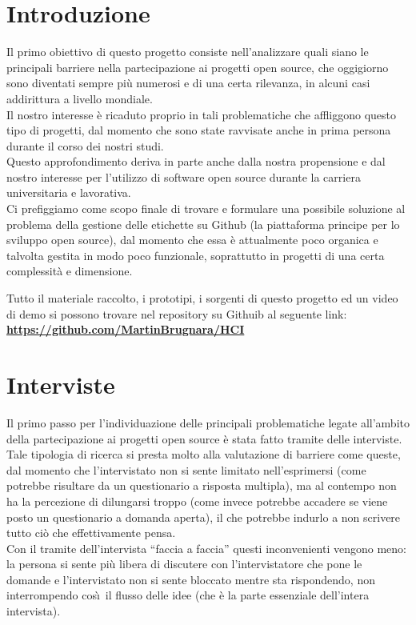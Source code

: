 \documentclass[12pt]{article} %
\begin{document}
\section{Introduzione}
Il primo obiettivo di questo progetto consiste nell'analizzare quali siano le principali barriere nella partecipazione ai progetti open source, che oggigiorno sono diventati sempre pi\`u numerosi e di una certa rilevanza, in alcuni casi addirittura a livello mondiale.\\
Il nostro interesse \`e ricaduto proprio in tali problematiche che affliggono questo tipo di progetti, dal momento che sono state ravvisate anche in prima persona durante il corso dei nostri studi.\\
Questo approfondimento deriva in parte anche dalla nostra propensione e dal nostro interesse per l'utilizzo di software open source durante la carriera universitaria e lavorativa.\\
Ci prefiggiamo come scopo finale di trovare e formulare una possibile soluzione al problema della gestione delle etichette su Github (la piattaforma principe per lo sviluppo open source), dal momento che essa \`e attualmente poco organica e talvolta gestita in modo poco funzionale, soprattutto in progetti di una certa complessit\`a e dimensione.\\
\vfill
\begin{center}
Tutto il materiale raccolto, i prototipi, i sorgenti di questo progetto ed un video di demo si possono trovare nel repository su Githuib al seguente link:\\
\textbf{\url{https://github.com/MartinBrugnara/HCI}}
\end{center}

\newpage

\section{Interviste}
Il primo passo per l'individuazione delle principali problematiche legate all'ambito della partecipazione ai progetti open source \`e stata fatto tramite delle interviste. Tale tipologia di ricerca si presta molto alla valutazione di barriere come queste, dal momento che l'intervistato non si sente limitato nell'esprimersi (come potrebbe risultare da un questionario a risposta multipla), ma al contempo non ha la percezione di dilungarsi troppo (come invece potrebbe accadere se viene posto un questionario a domanda aperta), il che potrebbe indurlo a non scrivere tutto ci\`o che effettivamente pensa.\\
Con il tramite dell'intervista ``faccia a faccia'' questi inconvenienti vengono meno: la persona si sente pi\`u libera di discutere con l'intervistatore che pone le domande e l'intervistato non si sente bloccato mentre sta rispondendo, non interrompendo cos\`\i\ il flusso delle idee (che \`e la parte essenziale dell'intera intervista).\\
\end{document}
